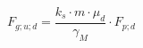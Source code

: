 \documentclass[12pt]{article}
\begin{document}
\begin{displaymath}
F_{g;u;d} = \frac {k_s \cdot m \cdot \mu_d} {\gamma_M} \cdot F_{p;d}
\end{displaymath}
\end{document}
